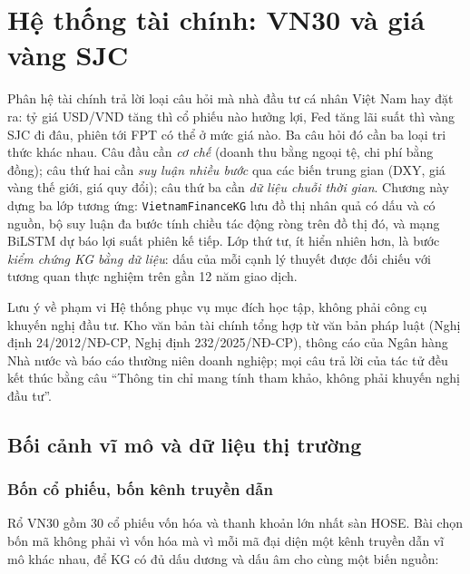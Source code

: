 \chapter{Hệ thống tài chính: VN30 và giá vàng SJC}\label{chap:taichinh}

Phân hệ tài chính trả lời loại câu hỏi mà nhà đầu tư cá nhân Việt Nam hay đặt ra: tỷ giá USD/VND tăng thì cổ phiếu
nào hưởng lợi, Fed tăng lãi suất thì vàng SJC đi đâu, phiên tới FPT có thể ở mức giá nào. Ba câu hỏi đó cần ba loại
tri thức khác nhau. Câu đầu cần \emph{cơ chế} (doanh thu bằng ngoại tệ, chi phí bằng đồng); câu thứ hai cần \emph{suy
luận nhiều bước} qua các biến trung gian (DXY, giá vàng thế giới, giá quy đổi); câu thứ ba cần \emph{dữ liệu chuỗi
thời gian}. Chương này dựng ba lớp tương ứng: \texttt{VietnamFinanceKG} lưu đồ thị nhân quả có dấu và có nguồn,
bộ suy luận đa bước tính chiều tác động ròng trên đồ thị đó, và mạng BiLSTM dự báo lợi suất phiên kế tiếp. Lớp thứ
tư, ít hiển nhiên hơn, là bước \emph{kiểm chứng KG bằng dữ liệu}: dấu của mỗi cạnh lý thuyết được đối chiếu với
tương quan thực nghiệm trên gần 12 năm giao dịch.

\begin{phathien}{Lưu ý về phạm vi}
Hệ thống phục vụ mục đích học tập, không phải công cụ khuyến nghị đầu tư. Kho văn bản tài chính tổng hợp từ văn bản
pháp luật (Nghị định 24/2012/NĐ-CP, Nghị định 232/2025/NĐ-CP), thông cáo của Ngân hàng Nhà nước và báo cáo thường
niên doanh nghiệp; mọi câu trả lời của tác tử đều kết thúc bằng câu ``Thông tin chỉ mang tính tham khảo, không phải
khuyến nghị đầu tư''.
\end{phathien}

\section{Bối cảnh vĩ mô và dữ liệu thị trường}\label{sec:tc-boicanh}
\subsection{Bốn cổ phiếu, bốn kênh truyền dẫn}
Rổ VN30 gồm 30 cổ phiếu vốn hóa và thanh khoản lớn nhất sàn HOSE. Bài chọn bốn mã không phải vì vốn hóa mà vì mỗi
mã đại diện một kênh truyền dẫn vĩ mô khác nhau, để KG có đủ dấu dương và dấu âm cho cùng một biến nguồn:

